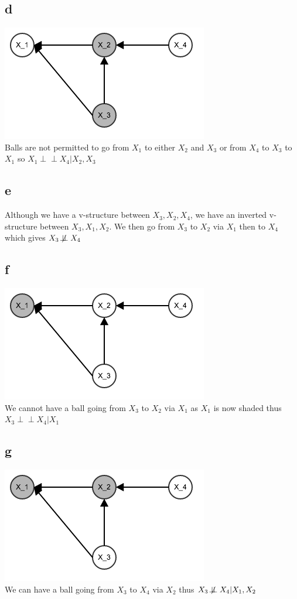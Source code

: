 \documentclass[twoside]{homework}
\begin{document}
\subsection*{d}
\includegraphics[scale=0.5]{2d}\\
Balls are not permitted to go from $X_1$ to either $X_2$ and $X_3$ or from $X_4$ to $X_3$ to $X_1$ so $X_1\!\perp\!\!\!\perp X_4 | X_2, X_3$
\subsection*{e}
Although we have a v-structure between $X_3, X_2, X_4$, we have an inverted v-structure between $X_3, X_1, X_2$. We then go from $X_3$ to $X_2$ via $X_1$ then to $X_4$ which gives $X_3 \not\!\perp\!\!\!\perp X_4$
\subsection*{f}
\includegraphics[scale=0.5]{2f}\\
We cannot have a ball going from $X_3$ to $X_2$ via $X_1$ as $X_1$ is now shaded thus $X_3 \!\perp\!\!\!\perp X_4 | X_1$
\subsection*{g}
\includegraphics[scale=0.5]{2g}\\
We can have a ball going from $X_3$ to $X_4$ via $X_2$ thus $X_3 \not\!\perp\!\!\!\perp X_4 | X_1, X_2$
\end{document}
